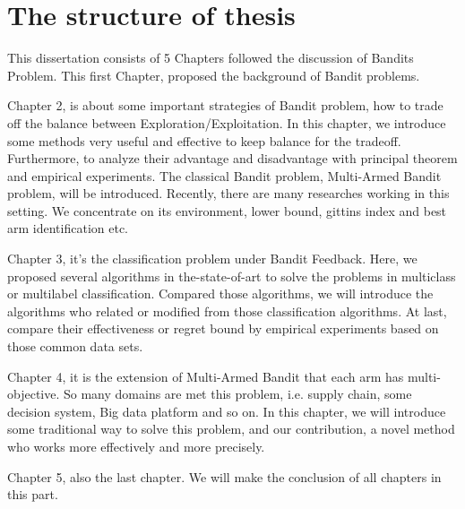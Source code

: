 \section{The structure of thesis}
\label{sec:structure}

This dissertation consists of 5 Chapters followed the discussion of Bandits Problem. This first Chapter, proposed the background of Bandit problems.

Chapter 2, is about some important strategies of Bandit problem, how to trade off the balance between Exploration/Exploitation. In this chapter, we introduce some methods very useful and effective to keep balance for the tradeoff. Furthermore, to analyze their advantage and disadvantage with principal theorem and empirical experiments. The classical Bandit problem, Multi-Armed Bandit problem, will be introduced. Recently, there are many researches working in this setting. We concentrate on its environment, lower bound, gittins index and best arm identification etc.

Chapter 3, it's the classification problem under Bandit Feedback. Here, we proposed several algorithms in the-state-of-art to solve the problems in multiclass or multilabel classification. Compared those algorithms, we will introduce the algorithms who related or modified from those classification algorithms. At last, compare their effectiveness or regret bound by empirical experiments based on those common data sets.

Chapter 4, it is the extension of Multi-Armed Bandit that each arm has multi-objective. So many domains are met this problem, i.e. supply chain, some decision system, Big data platform and so on. In this chapter, we will introduce some traditional way to solve this problem, and our contribution, a novel method who works more effectively and more precisely.

Chapter 5, also the last chapter. We will make the conclusion of all chapters in this part.